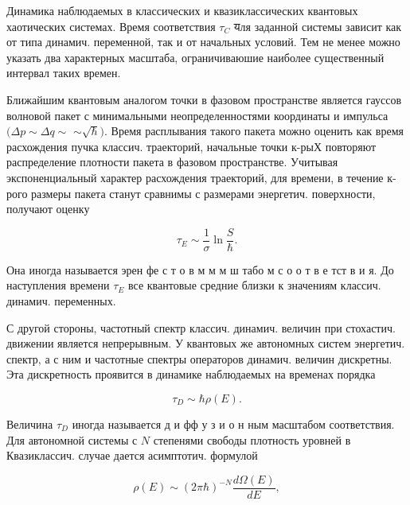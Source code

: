 \documentclass[10pt]{article}
\begin{document}
Динамика наблюдаемых в классических и квазиклассических квантовых хаотических системах. Время соответствия $\tau_{C}$ यля заданной системы зависит как от типа динамич. переменной, так и от начальных условий. Тем не менее можно указать два характерных масштаба, ограничиваюшие наиболее существенный интервал таких времен.



Ближайшим квантовым аналогом точки в фазовом пространстве является гауссов волновой пакет с минимальными неопределенностями координаты и импульса $(\Delta p \sim \Delta q \sim$ $\sim \sqrt{\hbar})$. Время расплывания такого пакета можно оценить как время расхождения пучка классич. траекторий, начальные точки к-рыХ повторяют распределение плотности пакета в фазовом пространстве. Учитывая экспоненциальный характер расхождения траекторий, для времени, в течение к-рого размеры пакета станут сравнимы с размерами энергетич. поверхности, получают оценку



\[

\tau_{E} \sim \frac{1}{\sigma} \ln \frac{S}{\hbar} .

\]



Она иногда называется эрен фе с т о в м м м ш табо м с о о т в е тст в и я. До наступления времени $\tau_{E}$ все квантовые средние близки к значениям классич. динамич. переменных.



С другой стороны, частотный спектр классич. динамич. величин при стохастич. движении является непрерывным. У квантовых же автономных систем энергетич. спектр, а с ним и частотные спектры операторов динамич. величин дискретны. Эта дискретность проявится в динамике наблюдаемых на временах порядка



\[

\tau_{D} \sim \hbar \rho(E) .

\]



Величина $\tau_{D}$ иногда называется д и фф у з и о н ным масштабом соответствия. Для автономной системы с $N$ степенями свободы плотность уровней в Квазиклассич. случае дается асимптотич. формулой



\[

\rho(E) \sim(2 \pi \hbar)^{-N} \frac{d \Omega(E)}{d E},

\]
\end{document}
